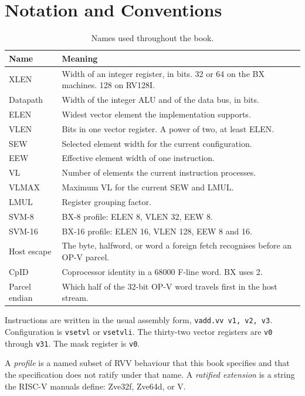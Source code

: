 \chapter{Notation and Conventions}

\begin{table}[htbp]
\centering
\caption{Names used throughout the book.}
\begin{tabular}{@{}lp{8.5cm}@{}}
\toprule
Name & Meaning \\
\midrule
XLEN & Width of an integer register, in bits. 32 or 64 on the BX machines. 128 on RV128I. \\
Datapath & Width of the integer ALU and of the data bus, in bits. \\
ELEN & Widest vector element the implementation supports. \\
VLEN & Bits in one vector register. A power of two, at least ELEN. \\
SEW & Selected element width for the current configuration. \\
EEW & Effective element width of one instruction. \\
VL & Number of elements the current instruction processes. \\
VLMAX & Maximum VL for the current SEW and LMUL. \\
LMUL & Register grouping factor. \\
SVM-8 & BX-8 profile: ELEN 8, VLEN 32, EEW 8. \\
SVM-16 & BX-16 profile: ELEN 16, VLEN 128, EEW 8 and 16. \\
Host escape & The byte, halfword, or word a foreign fetch recognises before an OP-V parcel. \\
CpID & Coprocessor identity in a 68000 F-line word. BX uses 2. \\
Parcel endian & Which half of the 32-bit OP-V word travels first in the host stream. \\
\bottomrule
\end{tabular}
\end{table}

Instructions are written in the usual assembly form, \texttt{vadd.vv v1, v2, v3}. Configuration is \texttt{vsetvl} or \texttt{vsetvli}. The thirty-two vector registers are \texttt{v0} through \texttt{v31}. The mask register is \texttt{v0}.

A \emph{profile} is a named subset of RVV behaviour that this book specifies and that the specification does not ratify under that name. A \emph{ratified extension} is a string the RISC-V manuals define: Zve32f, Zve64d, or V.

